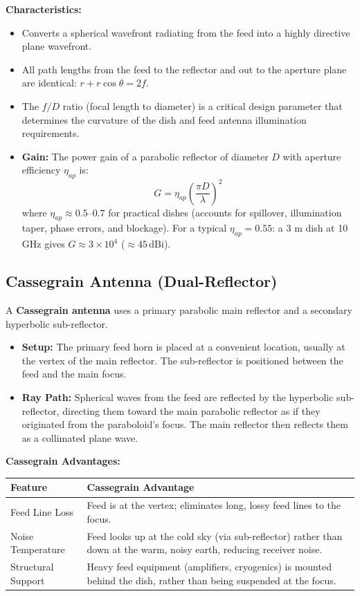 \documentclass[12pt,a4paper]{article}
\renewcommand{\arraystretch}{1.45}
\begin{document}
\textbf{Characteristics:}
\begin{itemize}[leftmargin=*, itemsep=3pt]
  \item Converts a spherical wavefront radiating from the feed into a highly directive plane wavefront.
  \item All path lengths from the feed to the reflector and out to the aperture plane are identical: $r + r\cos\theta = 2f$.
  \item The $f/D$ ratio (focal length to diameter) is a critical design parameter that determines the curvature of the dish and feed antenna illumination requirements.
  \item \textbf{Gain:} The power gain of a parabolic reflector of diameter $D$ with aperture efficiency $\eta_{ap}$ is:
  \[
  G = \eta_{ap} \left( \frac{\pi D}{\lambda} \right)^{\!2}
  \]
  where $\eta_{ap} \approx 0.5$–$0.7$ for practical dishes (accounts for spillover, illumination taper, phase errors, and blockage). For a typical $\eta_{ap} = 0.55$: a 3 m dish at 10 GHz gives $G \approx 3 \times 10^4$ ($\approx 45\,\text{dBi}$).\end{itemize}

\subsection{Cassegrain Antenna (Dual-Reflector)}
A \textbf{Cassegrain antenna} uses a primary parabolic main reflector and a secondary hyperbolic sub-reflector.
\begin{itemize}[leftmargin=*, itemsep=3pt]
  \item \textbf{Setup:} The primary feed horn is placed at a convenient location, usually at the vertex of the main reflector. The sub-reflector is positioned between the feed and the main focus.
  \item \textbf{Ray Path:} Spherical waves from the feed are reflected by the hyperbolic sub-reflector, directing them toward the main parabolic reflector as if they originated from the paraboloid's focus. The main reflector then reflects them as a collimated plane wave.
\end{itemize}

\par\noindent
\textbf{Cassegrain Advantages:}\par\noindent
{\renewcommand{\arraystretch}{1.45}%
\begin{tabularx}{\linewidth}{|B{3.5cm}|Y|}
\hline
\textbf{Feature} & \textbf{Cassegrain Advantage} \\
\hline
Feed Line Loss & Feed is at the vertex; eliminates long, lossy feed lines to the focus. \\
\hline
Noise Temperature & Feed looks up at the cold sky (via sub-reflector) rather than down at the warm, noisy earth, reducing receiver noise. \\
\hline
Structural Support & Heavy feed equipment (amplifiers, cryogenics) is mounted behind the dish, rather than being suspended at the focus. \\
\hline
\end{tabularx}}
\end{document}
